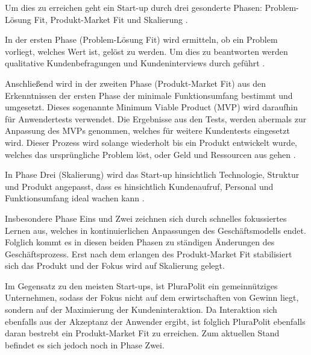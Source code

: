 Um dies zu erreichen geht ein Start-up durch drei gesonderte Phasen: Problem-Lösung Fit, Produkt-Market Fit und Skalierung \parencite[vgl.][S. 8 f.]{maurya_running_2012}.

In der ersten Phase (Problem-Lösung Fit) wird ermitteln, ob ein Problem vorliegt, welches Wert ist, gelöst zu werden. Um dies zu beantworten werden qualitative Kundenbefragungen und Kundeninterviews durch geführt \parencite[vgl.][S. 170 ff.]{croll_lean_2013}.

Anschließend wird in der zweiten Phase (Produkt-Market Fit)  aus den Erkenntnissen der ersten Phase der minimale Funktionsumfang bestimmt und umgesetzt. Dieses sogenannte Minimum Viable Product (MVP) wird daraufhin für Anwendertests verwendet. Die Ergebnisse aus den Tests, werden abermals zur Anpassung des MVPs genommen, welches für weitere Kundentests eingesetzt wird. Dieser Prozess wird solange wiederholt bis ein Produkt entwickelt wurde, welches das ursprüngliche Problem löst, oder Geld und Ressourcen aus gehen \parencite[vgl.][S. 28]{croll_lean_2013}.

In Phase Drei (Skalierung) wird das Start-up hinsichtlich Technologie, Struktur und Produkt angepasst, dass es hinsichtlich Kundenaufruf, Personal und Funktionsumfang ideal wachen kann \parencite[vgl.][S. 9]{maurya_running_2012}.

Insbesondere Phase Eins und Zwei zeichnen sich durch schnelles fokussiertes Lernen aus, welches in kontinuierlichen Anpassungen des Geschäftsmodells endet. Folglich kommt es in diesen beiden Phasen zu ständigen Änderungen des Geschäftsprozess. Erst nach dem erlangen des Produkt-Market Fit stabilisiert sich das Produkt und der Fokus wird auf Skalierung gelegt.

Im Gegensatz zu den meisten Start-ups, ist PluraPolit ein gemeinnütziges Unternehmen, sodass der Fokus nicht auf dem erwirtschaften von Gewinn liegt, sondern auf der Maximierung der Kundeninteraktion. Da Interaktion sich ebenfalls aus der Akzeptanz der Anwender ergibt, ist folglich PluraPolit ebenfalls daran bestrebt ein Produkt-Market Fit zu erreichen. Zum aktuellen Stand befindet es sich jedoch noch in Phase Zwei.
